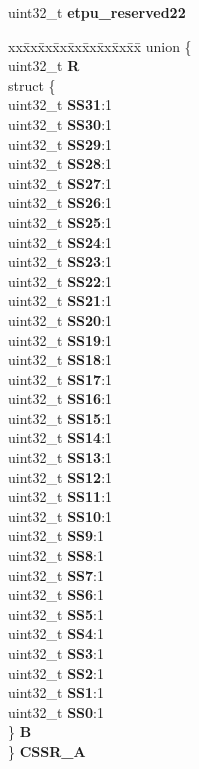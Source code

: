 \begin{DoxyCompactItemize}
\begin{tabbing}
\end{tabbing}\item 
\mbox{\label{structETPU__tag_a088933d82386e53845722d8c81187c7e}} 
uint32\+\_\+t {\bfseries etpu\+\_\+reserved22}
\item 
\mbox{\label{structETPU__tag_a7ebea9e45197de6c68b03122c912414b}} 
\begin{tabbing}
xx\=xx\=xx\=xx\=xx\=xx\=xx\=xx\=xx\=\kill
union \{\\
\>uint32\_t {\bfseries R}\\
\>struct \{\\
\>\>uint32\_t {\bfseries SS31}:1\\
\>\>uint32\_t {\bfseries SS30}:1\\
\>\>uint32\_t {\bfseries SS29}:1\\
\>\>uint32\_t {\bfseries SS28}:1\\
\>\>uint32\_t {\bfseries SS27}:1\\
\>\>uint32\_t {\bfseries SS26}:1\\
\>\>uint32\_t {\bfseries SS25}:1\\
\>\>uint32\_t {\bfseries SS24}:1\\
\>\>uint32\_t {\bfseries SS23}:1\\
\>\>uint32\_t {\bfseries SS22}:1\\
\>\>uint32\_t {\bfseries SS21}:1\\
\>\>uint32\_t {\bfseries SS20}:1\\
\>\>uint32\_t {\bfseries SS19}:1\\
\>\>uint32\_t {\bfseries SS18}:1\\
\>\>uint32\_t {\bfseries SS17}:1\\
\>\>uint32\_t {\bfseries SS16}:1\\
\>\>uint32\_t {\bfseries SS15}:1\\
\>\>uint32\_t {\bfseries SS14}:1\\
\>\>uint32\_t {\bfseries SS13}:1\\
\>\>uint32\_t {\bfseries SS12}:1\\
\>\>uint32\_t {\bfseries SS11}:1\\
\>\>uint32\_t {\bfseries SS10}:1\\
\>\>uint32\_t {\bfseries SS9}:1\\
\>\>uint32\_t {\bfseries SS8}:1\\
\>\>uint32\_t {\bfseries SS7}:1\\
\>\>uint32\_t {\bfseries SS6}:1\\
\>\>uint32\_t {\bfseries SS5}:1\\
\>\>uint32\_t {\bfseries SS4}:1\\
\>\>uint32\_t {\bfseries SS3}:1\\
\>\>uint32\_t {\bfseries SS2}:1\\
\>\>uint32\_t {\bfseries SS1}:1\\
\>\>uint32\_t {\bfseries SS0}:1\\
\>\} {\bfseries B}\\
\} {\bfseries CSSR\_A}\\


\end{tabbing}
\end{DoxyCompactItemize}
